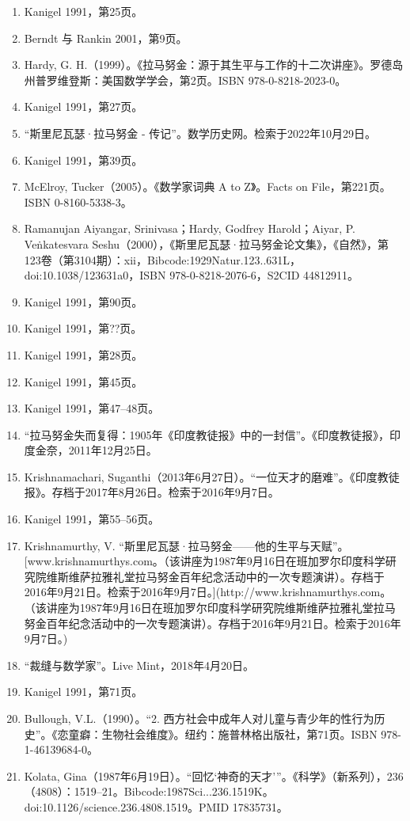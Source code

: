 \begin{enumerate}
\item Kanigel 1991，第25页。
\item Berndt 与 Rankin 2001，第9页。
\item Hardy, G. H.（1999）。《拉马努金：源于其生平与工作的十二次讲座》。罗德岛州普罗维登斯：美国数学学会，第2页。ISBN 978-0-8218-2023-0。
\item Kanigel 1991，第27页。
\item “斯里尼瓦瑟·拉马努金 - 传记”。数学历史网。检索于2022年10月29日。
\item Kanigel 1991，第39页。
\item McElroy, Tucker（2005）。《数学家词典 A to Z》。Facts on File，第221页。ISBN 0-8160-5338-3。
\item Ramanujan Aiyangar, Srinivasa；Hardy, Godfrey Harold；Aiyar, P. Veṅkatesvara Seshu（2000），《斯里尼瓦瑟·拉马努金论文集》，《自然》，第123卷（第3104期）：xii，Bibcode:1929Natur.123..631L，doi:10.1038/123631a0，ISBN 978-0-8218-2076-6，S2CID 44812911。
\item Kanigel 1991，第90页。
\item Kanigel 1991，第??页。
\item Kanigel 1991，第28页。
\item Kanigel 1991，第45页。
\item Kanigel 1991，第47–48页。
\item “拉马努金失而复得：1905年《印度教徒报》中的一封信”。《印度教徒报》，印度金奈，2011年12月25日。
\item Krishnamachari, Suganthi（2013年6月27日）。“一位天才的磨难”。《印度教徒报》。存档于2017年8月26日。检索于2016年9月7日。
\item Kanigel 1991，第55–56页。
\item Krishnamurthy, V. “斯里尼瓦瑟·拉马努金——他的生平与天赋”。[www.krishnamurthys.com。（该讲座为1987年9月16日在班加罗尔印度科学研究院维斯维萨拉雅礼堂拉马努金百年纪念活动中的一次专题演讲）。存档于2016年9月21日。检索于2016年9月7日。](http://www.krishnamurthys.com。（该讲座为1987年9月16日在班加罗尔印度科学研究院维斯维萨拉雅礼堂拉马努金百年纪念活动中的一次专题演讲）。存档于2016年9月21日。检索于2016年9月7日。)
\item “裁缝与数学家”。Live Mint，2018年4月20日。
\item Kanigel 1991，第71页。
\item Bullough, V.L.（1990）。“2. 西方社会中成年人对儿童与青少年的性行为历史”。《恋童癖：生物社会维度》。纽约：施普林格出版社，第71页。ISBN 978-1-46139684-0。
\item Kolata, Gina（1987年6月19日）。“回忆‘神奇的天才’”。《科学》（新系列），236（4808）：1519–21。Bibcode:1987Sci...236.1519K。doi:10.1126/science.236.4808.1519。PMID 17835731。
\end{enumerate}